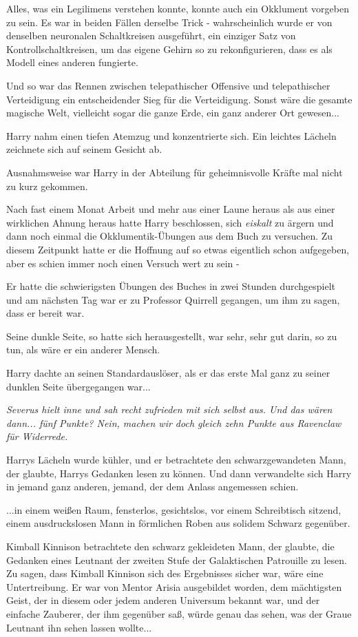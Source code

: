 Alles, was ein Legilimens verstehen konnte, konnte auch ein Okklument vorgeben
zu sein. Es war in beiden Fällen derselbe Trick - wahrscheinlich wurde er von
denselben neuronalen Schaltkreisen ausgeführt, ein einziger Satz von
Kontrollschaltkreisen, um das eigene Gehirn so zu rekonfigurieren, dass es als
Modell eines anderen fungierte.

Und so war das Rennen zwischen telepathischer Offensive und telepathischer
Verteidigung ein entscheidender Sieg für die Verteidigung. Sonst wäre die
gesamte magische Welt, vielleicht sogar die ganze Erde, ein ganz anderer Ort
gewesen...

Harry nahm einen tiefen Atemzug und konzentrierte sich. Ein leichtes Lächeln
zeichnete sich auf seinem Gesicht ab.

Ausnahmsweise war Harry in der Abteilung für geheimnisvolle Kräfte mal nicht zu
kurz gekommen.

Nach fast einem Monat Arbeit und mehr aus einer Laune heraus als aus einer
wirklichen Ahnung heraus hatte Harry beschlossen, sich \emph{eiskalt} zu ärgern
und dann noch einmal die Okklumentik-Übungen aus dem Buch zu versuchen. Zu
diesem Zeitpunkt hatte er die Hoffnung auf so etwas eigentlich schon aufgegeben,
aber es schien immer noch einen Versuch wert zu sein -

Er hatte die schwierigsten Übungen des Buches in zwei Stunden durchgespielt und
am nächsten Tag war er zu Professor Quirrell gegangen, um ihm zu sagen, dass er
bereit war.

Seine dunkle Seite, so hatte sich herausgestellt, war sehr, sehr gut darin, so
zu tun, als wäre er ein anderer Mensch.

Harry dachte an seinen Standardauslöser, als er das erste Mal ganz zu seiner
dunklen Seite übergegangen war...

\emph{Severus hielt inne und sah recht zufrieden mit sich selbst aus. \glqq{}
Und das wären dann... fünf Punkte? Nein, machen wir doch gleich zehn Punkte aus
Ravenclaw für Widerrede.\grqq{}}

Harrys Lächeln wurde kühler, und er betrachtete den schwarzgewandeten Mann, der
glaubte, Harrys Gedanken lesen zu können. Und dann verwandelte sich Harry in
jemand ganz anderen, jemand, der dem Anlass angemessen schien.

...in einem weißen Raum, fensterlos, gesichtslos, vor einem Schreibtisch
sitzend, einem ausdruckslosen Mann in förmlichen Roben aus solidem Schwarz
gegenüber.

Kimball Kinnison betrachtete den schwarz gekleideten Mann, der glaubte, die
Gedanken eines Leutnant der zweiten Stufe der Galaktischen Patrouille zu lesen.
Zu sagen, dass Kimball Kinnison sich des Ergebnisses sicher war, wäre eine
Untertreibung. Er war von Mentor Arisia ausgebildet worden, dem mächtigsten
Geist, der in diesem oder jedem anderen Universum bekannt war, und der einfache
Zauberer, der ihm gegenüber saß, würde genau das sehen, was der Graue Leutnant
ihn sehen lassen wollte...

